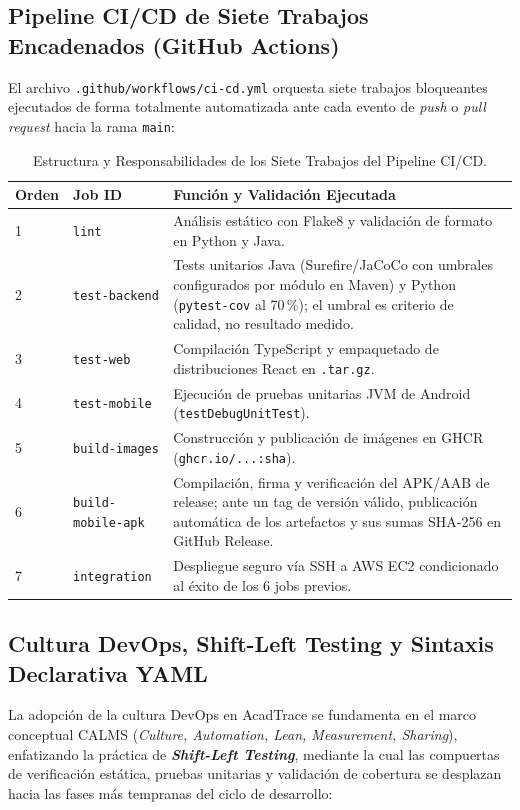 \documentclass[11pt,a4paper]{article}
\begin{document}
\subsection{Pipeline CI/CD de Siete Trabajos Encadenados (GitHub Actions)}
\label{subsec:pipeline-cicd}
El archivo \texttt{.github/workflows/ci-cd.yml} orquesta siete trabajos bloqueantes ejecutados de forma totalmente automatizada ante cada evento de \textit{push} o \textit{pull request} hacia la rama \texttt{main}:

\begin{table}[H]
\centering
\caption{Estructura y Responsabilidades de los Siete Trabajos del Pipeline CI/CD.}
\label{tab:pipeline-jobs}
\small
\begin{tabular}{|l|l|p{8.5cm}|}
\hline
\textbf{Orden} & \textbf{Job ID} & \textbf{Funci\'on y Validaci\'on Ejecutada} \\
\hline
1 & \texttt{lint} & An\'alisis est\'atico con Flake8 y validaci\'on de formato en Python y Java. \\
\hline
2 & \texttt{test-backend} & Tests unitarios Java (Surefire/JaCoCo con umbrales configurados por m\'odulo en Maven) y Python (\texttt{pytest-cov} al 70\,\%); el umbral es criterio de calidad, no resultado medido. \\
\hline
3 & \texttt{test-web} & Compilaci\'on TypeScript y empaquetado de distribuciones React en \texttt{.tar.gz}. \\
\hline
4 & \texttt{test-mobile} & Ejecuci\'on de pruebas unitarias JVM de Android (\texttt{testDebugUnitTest}). \\
\hline
5 & \texttt{build-images} & Construcci\'on y publicaci\'on de im\'agenes en GHCR (\texttt{ghcr.io/...:sha}). \\
\hline
6 & \texttt{build-mobile-apk} & Compilaci\'on, firma y verificaci\'on del APK/AAB de release; ante un tag de versi\'on v\'alido, publicaci\'on autom\'atica de los artefactos y sus sumas SHA-256 en GitHub Release. \\
\hline
7 & \texttt{integration} & Despliegue seguro v\'ia SSH a AWS EC2 condicionado al \'exito de los 6 jobs previos. \\
\hline
\end{tabular}
\end{table}

\subsection{Cultura DevOps, Shift-Left Testing y Sintaxis Declarativa YAML}
\label{subsec:devops-yaml}
La adopci\'on de la cultura DevOps en AcadTrace se fundamenta en el marco conceptual CALMS (\textit{Culture, Automation, Lean, Measurement, Sharing}), enfatizando la pr\'actica de \textbf{\textit{Shift-Left Testing}}, mediante la cual las compuertas de verificaci\'on est\'atica, pruebas unitarias y validaci\'on de cobertura se desplazan hacia las fases m\'as tempranas del ciclo de desarrollo:
\end{document}
